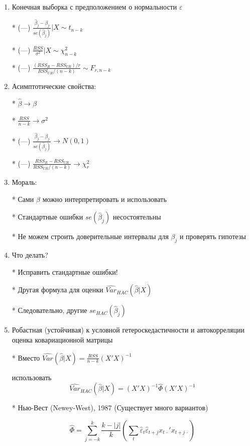 \documentclass[12pt,a4paper]{article}
\begin{document}
{\begin{enumerate}
* Условная несмещенность, $E(\hat{\beta}|X)=\beta$

* (---) Оценки неэффективны

\item  Конечная выборка с предположением о нормальности $\varepsilon$

* (---) $\frac{\hat{\beta}_j-\beta_j}{se(\hat{\beta}_j)} | X \sim t_{n-k}$

* (---) $\frac{RSS}{\sigma^2} |X \sim \chi^2_{n-k}$

* (---) $\frac{(RSS_R-RSS_{UR})/r}{RSS_{UR}/(n-k)} \sim F_{r,n-k}$

\newpage
\item  Асимптотические свойства:

*  $\hat{\beta} \to \beta $

* $\frac{RSS}{n-k} \to \sigma^2 $ 

* (---) $\frac{\hat{\beta}_j-\beta_j}{se(\hat{\beta}_j)} \to N(0,1)$

* (---) $\frac{RSS_R-RSS_{UR}}{RSS_{UR}/(n-k)} \to \chi^2_r$

\item Мораль:

* Сами $\hat{\beta}$ можно интерпретировать и использовать

* Стандартные ошибки $se(\hat{\beta}_j)$ несостоятельны

* Не можем строить доверительные интервалы для $\beta_j$ и проверять гипотезы

\newpage
\item Что делать?

* Исправить стандартные ошибки! 

* Другая формула для оценки $\widehat{Var}_{HAC}(\hat{\beta}|X)$

* Следовательно, другие $se_{HAC}(\hat{\beta}_j)$

\item Робастная (устойчивая) к условной гетероскедастичности и автокорреляции оценка ковариационной матрицы

* Вместо $\widehat{Var}(\hat{\beta}|X)=\frac{RSS}{n-k}(X'X)^{-1}$ 

использовать 
\[
\widehat{Var}_{HAC}(\hat{\beta}|X)=(X'X)^{-1}\hat{\Phi}(X'X)^{-1}
\]

* Нью-Вест (Newey-West), 1987  (Существует много вариантов)

\[
\hat{\Phi} = \sum_{j=-k}^k \frac{k-|j|}{k} \left(  \sum_t \hat{\varepsilon}_t\hat{\varepsilon}_{t+j} x_{t\,\cdot}'x_{t+j\,\cdot} \right)
\]


\end{enumerate}}
\end{document}
